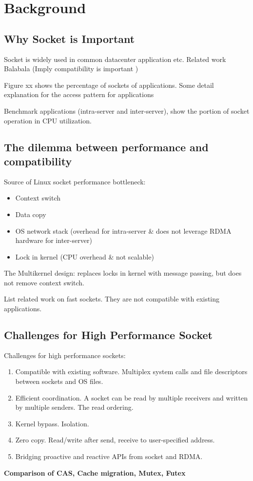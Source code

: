 \section{Background}
\label{sec:background}

\subsection{Why Socket is Important}

Socket is widely used in common datacenter application etc. Related work Balabala (Imply compatibility is important )

Figure xx shows the percentage of sockets of applications. Some detail explanation for the access pattern for applications

Benchmark applications (intra-server and inter-server), show the portion of socket operation in CPU utilization.



\subsection{The dilemma between performance and compatibility}
Source of Linux socket performance bottleneck:
\begin{itemize}
	\item Context switch
	\item Data copy
	\item OS network stack (overhead for intra-server \& does not leverage RDMA hardware for inter-server)
	\item Lock in kernel (CPU overhead \& not scalable)
\end{itemize}

The Multikernel design: replaces locks in kernel with message passing, but does not remove context switch.

List related work on fast sockets. They are not compatible with existing applications.

\subsection{Challenges for High Performance Socket}
\label{subsec:challenges}


Challenges for high performance sockets:
\begin{enumerate}
	\item Compatible with existing software. Multiplex system calls and file descriptors between sockets and OS files.
	\item Efficient coordination. A socket can be read by multiple receivers and written by multiple senders. The read ordering.
	\item Kernel bypass. Isolation.
	\item Zero copy. Read/write after send, receive to user-specified address.
	\item Bridging proactive and reactive APIs from socket and RDMA.
\end{enumerate}

\textbf{Comparison of CAS, Cache migration, Mutex, Futex}